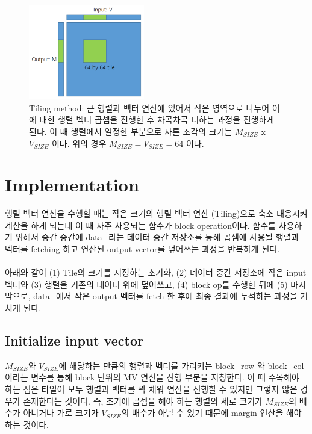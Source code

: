 \documentclass{article}
\begin{document}
\begin{figure}[ht]
	\centering
	\includegraphics[width=0.45\textwidth]{fig2.png}
	\caption{Tiling method: 큰 행렬과 벡터 연산에 있어서 작은 영역으로 나누어 이에 대한 행렬 벡터 곱셈을 진행한 후 차곡차곡 더하는 과정을 진행하게 된다. 이 때 행렬에서 일정한 부분으로 자른 조각의 크기는 $M_{SIZE}$ x $V_{SIZE}$ 이다. 위의 경우 $M_{SIZE} = V_{SIZE} = 64$ 이다.}
\label{fig2}
\end{figure}

\newpage
\section{Implementation}

행렬 벡터 연산을 수행할 때는 작은 크기의 행렬 벡터 연산 (Tiling)으로 축소 대응시켜 계산을 하게 되는데 이 때 자주 사용되는 함수가 block operation이다. 함수를 사용하기 위해서 중간 중간에 data\_라는 데이터 중간 저장소를 통해 곱셈에 사용될 행렬과 벡터를 fetching 하고 연산된 output vector를 덮어쓰는 과정을 반복하게 된다. \\
\\
아래와 같이 (1) Tile의 크기를 지정하는 초기화, (2) 데이터 중간 저장소에 작은 input 벡터와 (3) 행렬을 기존의 데이터 위에 덮어쓰고, (4) block op를 수행한 뒤에 (5) 마지막으로, data\_에서 작은 output 벡터를 fetch 한 후에 최종 결과에 누적하는 과정을 거치게 된다.
		
\subsection{Initialize input vector}
\label{sec:initialize}
$M_{SIZE}$와 $V_{SIZE}$에 해당하는 만큼의 행렬과 벡터를 가리키는 block\_row 와 block\_col이라는 변수를 통해 block 단위의 MV 연산을 진행 부분을 지칭한다. 이 때 주목해야 하는 점은 타일이 모두 행렬과 벡터를 꽉 채워 연산을 진행할 수 있지만 그렇지 않은 경우가 존재한다는 것이다. 즉, 초기에 곱셈을 해야 하는 행렬의 세로 크기가 $M_{SIZE}$의 배수가 아니거나 가로 크기가 $V_{SIZE}$의 배수가 아닐 수 있기 때문에 margin 연산을 해야하는 것이다.
\end{document}
